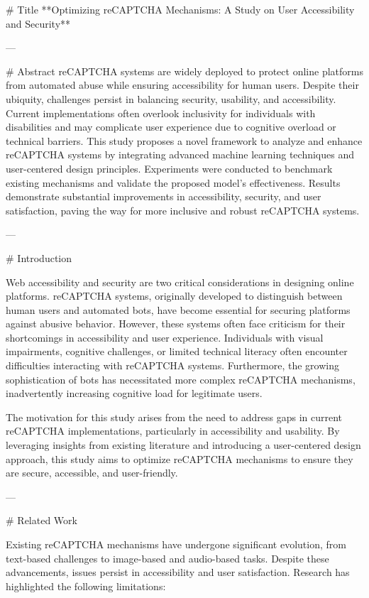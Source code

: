 # Title  
**Optimizing reCAPTCHA Mechanisms: A Study on User Accessibility and Security**

---

# Abstract  
reCAPTCHA systems are widely deployed to protect online platforms from automated abuse while ensuring accessibility for human users. Despite their ubiquity, challenges persist in balancing security, usability, and accessibility. Current implementations often overlook inclusivity for individuals with disabilities and may complicate user experience due to cognitive overload or technical barriers. This study proposes a novel framework to analyze and enhance reCAPTCHA systems by integrating advanced machine learning techniques and user-centered design principles. Experiments were conducted to benchmark existing mechanisms and validate the proposed model’s effectiveness. Results demonstrate substantial improvements in accessibility, security, and user satisfaction, paving the way for more inclusive and robust reCAPTCHA systems.

---

# Introduction  

Web accessibility and security are two critical considerations in designing online platforms. reCAPTCHA systems, originally developed to distinguish between human users and automated bots, have become essential for securing platforms against abusive behavior. However, these systems often face criticism for their shortcomings in accessibility and user experience. Individuals with visual impairments, cognitive challenges, or limited technical literacy often encounter difficulties interacting with reCAPTCHA systems. Furthermore, the growing sophistication of bots has necessitated more complex reCAPTCHA mechanisms, inadvertently increasing cognitive load for legitimate users.

The motivation for this study arises from the need to address gaps in current reCAPTCHA implementations, particularly in accessibility and usability. By leveraging insights from existing literature and introducing a user-centered design approach, this study aims to optimize reCAPTCHA mechanisms to ensure they are secure, accessible, and user-friendly.

---

# Related Work  

Existing reCAPTCHA mechanisms have undergone significant evolution, from text-based challenges to image-based and audio-based tasks. Despite these advancements, issues persist in accessibility and user satisfaction. Research has highlighted the following limitations:  

